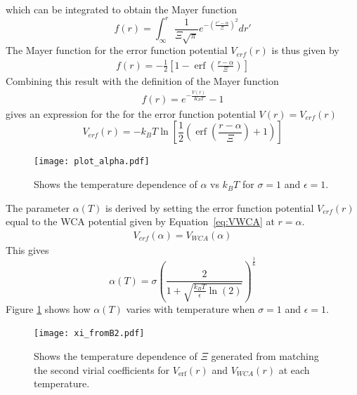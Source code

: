\documentclass[double,12pt]{beavtex}
\begin{document}
which can be integrated to obtain the Mayer function
\begin{equation}{f(r)=\int_{\infty}^r{ \frac{1}{\Xi\sqrt{\pi}}e^{-\left(\frac{r'-\alpha}{\Xi}\right)^2}{dr'}}}\end{equation} 
The Mayer function for the error function potential $V_{erf}(r)$ is thus 
given by
\begin{align}  \label{eq:VerfMayerfunction}
     f(r)=-\frac{1}{2}\left[1-\operatorname{erf}\left(\frac{r-\alpha}{\Xi}\right)\right]
\end{align} 
Combining this result with the definition of the Mayer function 
\begin{align}f(r)=e^{-\frac{V(r)}{K_BT}}-1\end{align} 
gives an expression for the for the error function potential  $V(r)=V_{erf}(r)$ 
\begin{equation} \label{eq:Verf}
	V_{erf}(r)=-k_BT\ln\left[\frac{1}{2}\left(\operatorname{erf}\left(\frac{r-\alpha}{\Xi}\right)+1\right)\right]
\end{equation}  

\begin{figure}
  \centering
  \texttt{[image: plot\_alpha.pdf]}
  \caption{Shows the temperature dependence of $\alpha$ vs $k_BT$ 
  for $\sigma=1$ and $\epsilon=1$.}
  \label{fig:alphaXivsT}
\end{figure}

The parameter $\alpha(T)$ is derived by setting 
the error function potential $V_{erf}(r)$ 
equal to the WCA potential given by Equation~\ref{eq:VWCA} at $r=\alpha$. 
\begin{align}
    V_{erf}(\alpha)=V_{WCA}(\alpha)
\end{align}
This gives
\begin{equation}\label{alphaT}\alpha(T)=\sigma\left(\frac{2}{1+\sqrt{\frac{k_BT}{\epsilon}\ln(2)}}\right)^\frac{1}{6}\end{equation} 
Figure \ref{fig:alphaXivsT} shows how $\alpha(T)$ varies with temperature 
when $\sigma=1$ and $\epsilon=1$.    

\begin{figure}
  \centering
  \texttt{[image: xi\_fromB2.pdf]}
  \caption{Shows the temperature dependence of $\Xi$ generated from 
  matching the second virial coefficients for $V_{\operatorname{erf}}(r)$ and $V_{WCA}(r)$ 
  at each temperature.}
  \label{fig:xi_fromB2vsT}
\end{figure}
\end{document}
